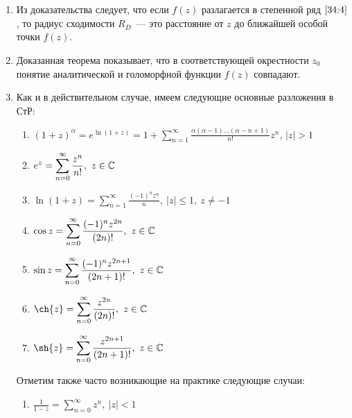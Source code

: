 \documentclass[../../main.tex]{subfiles}
\begin{document}
\begin{rems}
	
	\;
	
	\begin{enumerate}
		\item Из доказательства следует, что если $ f(z) $ разлагается в степенной 
		ряд $ \eqref{34:4} $, то радиус сходимости $ R_{\overline{D}} $~--- это 
		расстояние от $ z $ до ближайшей особой точки $ f(z) $.
		
		\item Доказанная теорема показывает, что в соответствующей окрестности $ z_0 
		$ понятие аналитической и голоморфной функции $f(z)$ совпадают.
		
		\item Как и в действительном случае, имеем следующие основные разложения в СтР:
		
		\begin{enumerate}
			\item $\displaystyle (1 + z)^\alpha = e^{\ln(1 + z)} = 1 + \sum\limits_{n = 1}^{\infty} 
			\frac{\alpha(\alpha - 1) \ldots (\alpha - n +1)}{n!}z^n,\, |z| > 1 $
			
			\item $\displaystyle e^z = \sum\limits_{n = 0}^{\infty} \frac{z^n}{n!},\ z \in \mathbb{C} $
			
			\item $\displaystyle \ln(1 + z) = \sum\limits_{n = 1}^{\infty} \frac{(-1)^nz^n}{n},\ |z| \leq 1,\  z \neq -1 $
			
			\item $\displaystyle \cos{z} = \sum\limits_{n = 0}^{\infty} 
			\frac{(-1)^nz^{2n}}{(2n)!},\  z \in \mathbb{C} $
			
			\item $\displaystyle \sin{z} = \sum\limits_{n = 0}^{\infty} \frac{(-1)^nz^{2n + 1}}{(2n 
			+ 1)!},\  z \in \mathbb{C} $
			
			\item $\displaystyle \ch{z} = \sum\limits_{n = 0}^{\infty} \frac{z^{2n}}{(2n)!},\  z \in \C $
			
			\item $\displaystyle \sh{z} = \sum\limits_{n = 0}^{\infty} \frac{z^{2n + 1}}{(2n + 
			1)!},\ z \in \C $
		\end{enumerate}
		
		Отметим также часто возникающие на практике следующие случаи:
		
		\begin{enumerate}
			\item $\displaystyle \frac{1}{1 - z} = \sum\limits_{n = 0}^{\infty} z^n,\ |z| < 1$
			

\end{enumerate}
\end{enumerate}
\end{rems}
\end{document}
